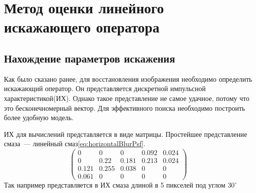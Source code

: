 \chapter{Метод оценки линейного искажающего оператора}
\section{Нахождение параметров искажения}
Как было сказано ранее, для восстановления изображения необходимо определить искажающий оператор. Он представляется дискретной импульсной характеристикой(ИХ). Однако такое представление не самое удачное, потому что это бесконечномерный вектор. Для эффективного поиска необходимо построить более удобную модель.

ИХ для вычислений представляется в виде матрицы. Простейшее представление смаза~--- линейный смаз\ref{eq:horizontalBlurPsf}.
\begin{equation}\label{eq:linearBlurArray}
\begin{pmatrix}
0 & 0 & 0 & 0.092 & 0.024\\
0 & 0.22 & 0.181 & 0.213 & 0.024\\
0.121 & 0.255 & 0.038 & 0 & 0\\
0.061 & 0 & 0 & 0 & 0
\end{pmatrix}
\end{equation}
Так например представляется в ИХ смаза длиной в 5 пикселей под углом $30^\circ$
